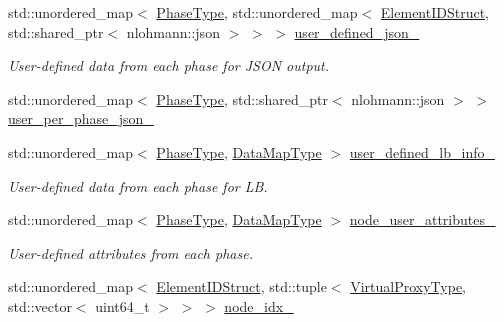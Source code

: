 \begin{DoxyCompactItemize}
std\+::unordered\+\_\+map$<$ \hyperlink{namespacevt_a46ce6733d5cdbd735d561b7b4029f6d7}{Phase\+Type}, std\+::unordered\+\_\+map$<$ \hyperlink{namespacevt_1_1vrt_1_1collection_1_1balance_a9f5b53fafb270212279a4757d2c4cd28}{Element\+I\+D\+Struct}, std\+::shared\+\_\+ptr$<$ nlohmann\+::json $>$ $>$ $>$ \hyperlink{structvt_1_1vrt_1_1collection_1_1balance_1_1_l_b_data_holder_a38dc8aada18756357212f4229ea363da}{user\+\_\+defined\+\_\+json\+\_\+}
\begin{DoxyCompactList}\small\item\em User-\/defined data from each phase for J\+S\+ON output. \end{DoxyCompactList}\item 
std\+::unordered\+\_\+map$<$ \hyperlink{namespacevt_a46ce6733d5cdbd735d561b7b4029f6d7}{Phase\+Type}, std\+::shared\+\_\+ptr$<$ nlohmann\+::json $>$ $>$ \hyperlink{structvt_1_1vrt_1_1collection_1_1balance_1_1_l_b_data_holder_aa4b11a094d2f858d29e4a91d61942ddf}{user\+\_\+per\+\_\+phase\+\_\+json\+\_\+}
\item 
std\+::unordered\+\_\+map$<$ \hyperlink{namespacevt_a46ce6733d5cdbd735d561b7b4029f6d7}{Phase\+Type}, \hyperlink{namespacevt_1_1vrt_1_1collection_1_1balance_acf152c668ed9e2e9c6b29784181d2435}{Data\+Map\+Type} $>$ \hyperlink{structvt_1_1vrt_1_1collection_1_1balance_1_1_l_b_data_holder_ad5b8a5a6093c4edd34a10069551c1d19}{user\+\_\+defined\+\_\+lb\+\_\+info\+\_\+}
\begin{DoxyCompactList}\small\item\em User-\/defined data from each phase for LB. \end{DoxyCompactList}\item 
std\+::unordered\+\_\+map$<$ \hyperlink{namespacevt_a46ce6733d5cdbd735d561b7b4029f6d7}{Phase\+Type}, \hyperlink{namespacevt_1_1vrt_1_1collection_1_1balance_acf152c668ed9e2e9c6b29784181d2435}{Data\+Map\+Type} $>$ \hyperlink{structvt_1_1vrt_1_1collection_1_1balance_1_1_l_b_data_holder_a24fff50ee98c5fc97ea1e3b6155fea9e}{node\+\_\+user\+\_\+attributes\+\_\+}
\begin{DoxyCompactList}\small\item\em User-\/defined attributes from each phase. \end{DoxyCompactList}\item 
std\+::unordered\+\_\+map$<$ \hyperlink{namespacevt_1_1vrt_1_1collection_1_1balance_a9f5b53fafb270212279a4757d2c4cd28}{Element\+I\+D\+Struct}, std\+::tuple$<$ \hyperlink{namespacevt_a1b417dd5d684f045bb58a0ede70045ac}{Virtual\+Proxy\+Type}, std\+::vector$<$ uint64\+\_\+t $>$ $>$ $>$ \hyperlink{structvt_1_1vrt_1_1collection_1_1balance_1_1_l_b_data_holder_a6b316a4e35ea98e592cbe875074aa6d8}{node\+\_\+idx\+\_\+}

\end{DoxyCompactItemize}
